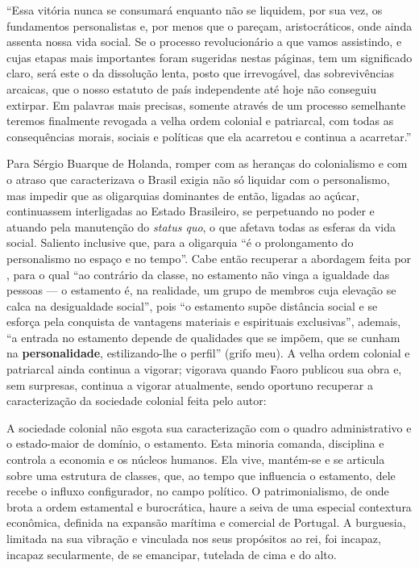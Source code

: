 	\begin{citacao}
		``Essa vitória nunca se consumará enquanto não se liquidem, por sua vez, os fundamentos personalistas e, por menos que o pareçam, aristocráticos, onde ainda assenta nossa vida social. Se o processo revolucionário a que vamos assistindo, e cujas etapas mais importantes foram sugeridas nestas páginas, tem um significado claro, será este o da dissolução lenta, posto que irrevogável, das sobrevivências arcaicas, que o nosso estatuto de país independente até hoje não conseguiu extirpar. Em palavras mais precisas, somente através de um processo semelhante teremos finalmente revogada a velha ordem colonial e patriarcal, com todas as consequências morais, sociais e políticas que ela acarretou e continua a acarretar.'' \cite[p. 180]{Holanda1995}
	\end{citacao}

	Para Sérgio Buarque de Holanda, romper com as heranças do colonialismo e com o atraso que caracterizava o Brasil exigia não só liquidar com o personalismo, mas impedir que as oligarquias dominantes de então, ligadas ao açúcar, continuassem interligadas ao Estado Brasileiro, se perpetuando no poder e atuando pela manutenção do \textit{status quo}, o que afetava todas as esferas da vida social. Saliento inclusive que, para  a oligarquia ``é o prolongamento do personalismo no espaço e no tempo''. Cabe então recuperar a abordagem feita por , para o qual ``ao contrário da classe, no estamento não vinga a igualdade das pessoas --- o estamento é, na realidade, um grupo de membros cuja elevação se calca na desigualdade social'', pois ``o estamento supõe distância social e se esforça pela conquista de vantagens materiais e espirituais exclusivas'', ademais, ``a entrada no estamento depende de qualidades que se impõem, que se cunham na \textbf{personalidade}, estilizando-lhe o perfil'' (grifo meu). A velha ordem colonial e patriarcal ainda continua a vigorar; vigorava quando Faoro publicou sua obra e, sem surpresas, continua a vigorar atualmente, sendo oportuno recuperar a caracterização da sociedade colonial feita pelo autor:
	
	\begin{citacao}
		A sociedade colonial não esgota sua caracterização com o quadro administrativo e o estado-maior de domínio, o estamento. Esta minoria comanda, disciplina e controla a economia e os núcleos humanos. Ela vive, mantém-se e se articula sobre uma estrutura de classes, que, ao tempo que influencia o estamento, dele recebe o influxo configurador, no campo político. O patrimonialismo, de onde brota a ordem estamental e burocrática, haure a seiva de uma especial contextura econômica, definida na expansão marítima e comercial de Portugal. A burguesia, limitada na sua vibração e vinculada nos seus propósitos ao rei, foi incapaz, incapaz secularmente, de se emancipar, tutelada de cima e do alto. \cite[p. 242]{Faoro2001}
	\end{citacao}
	
